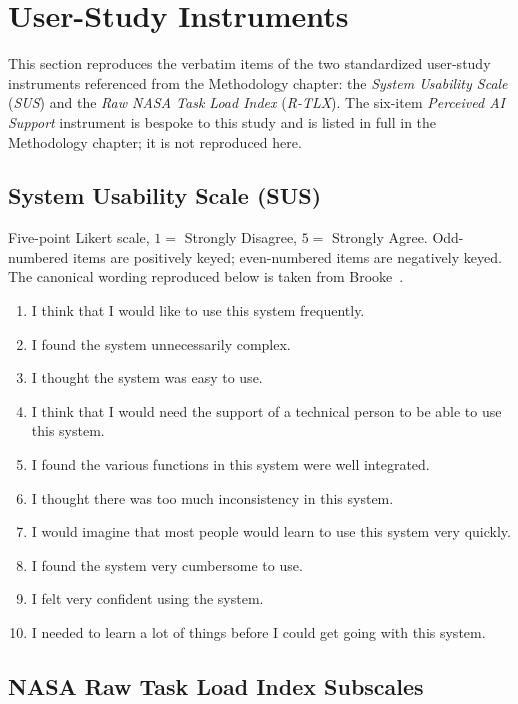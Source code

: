 \section{User-Study Instruments}
\label{app:sus-rtlx-items}

This section reproduces the verbatim items of the two standardized
user-study instruments referenced from the Methodology chapter:
the \textit{System Usability Scale} (\textit{SUS}) and the \textit{Raw NASA Task Load Index}
(\textit{R-TLX}). The six-item \textit{Perceived AI Support} instrument is bespoke
to this study and is listed in full in the Methodology chapter;
it is not reproduced here.

\subsection{System Usability Scale (SUS)}
\label{app:sus-items}

Five-point Likert scale, $1 = $ Strongly Disagree, $5 = $ Strongly
Agree. Odd-numbered items are positively keyed; even-numbered
items are negatively keyed. The canonical wording reproduced below
is taken from Brooke~\cite{Brooke1996}.

\begin{enumerate}
    \item I think that I would like to use this system frequently.
    \item I found the system unnecessarily complex.
    \item I thought the system was easy to use.
    \item I think that I would need the support of a technical person to be able to use this system.
    \item I found the various functions in this system were well integrated.
    \item I thought there was too much inconsistency in this system.
    \item I would imagine that most people would learn to use this system very quickly.
    \item I found the system very cumbersome to use.
    \item I felt very confident using the system.
    \item I needed to learn a lot of things before I could get going with this system.
\end{enumerate}

\subsection{NASA Raw Task Load Index Subscales}
\label{app:rtlx-items}

